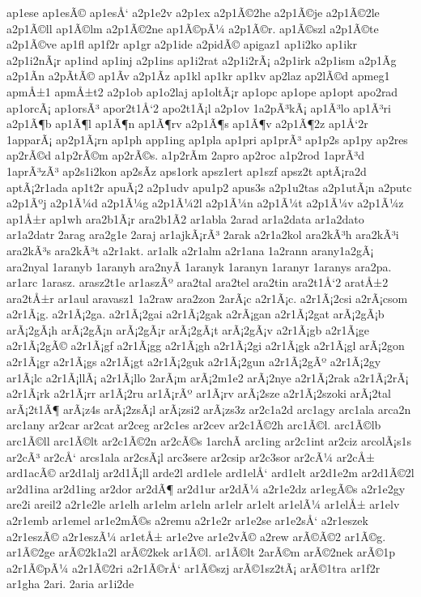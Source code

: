 {ap1ese
ap1esÃ©
ap1esÅ‘
a2p1e2v
a2p1ex
a2p1Ã©2he
a2p1Ã©je
a2p1Ã©2le
a2p1Ã©ll
ap1Ã©lm
a2p1Ã©2ne
ap1Ã©pÃ¼
a2p1Ã©r.
ap1Ã©szl
a2p1Ã©te
a2p1Ã©ve
ap1fl
ap1f2r
ap1gr
a2p1ide
a2pidÃ©
apigaz1
ap1i2ko
ap1ikr
a2p1i2nÃ¡r
ap1ind
ap1inj
a2p1ins
ap1i2rat
a2p1i2rÃ¡
a2p1irk
a2p1ism
a2p1Ã­g
a2p1Ã­n
a2pÃ­tÃ©
ap1Ã­v
a2p1Ã­z
ap1kl
ap1kr
ap1kv
ap2laz
ap2lÃ©d
apmeg1
apmÅ±1
apmÅ±t2
a2p1ob
ap1o2laj
ap1oltÃ¡r
ap1opc
ap1ope
ap1opt
apo2rad
ap1orcÃ¡
ap1orsÃ³
apor2t1Å‘2
apo2t1Ã¡l
a2p1ov
1a2pÃ³kÃ¡
ap1Ã³lo
ap1Ã³ri
a2p1Ã¶b
ap1Ã¶l
ap1Ã¶n
ap1Ã¶rv
a2p1Ã¶s
ap1Ã¶v
a2p1Ã¶2z
ap1Å‘2r
1apparÃ¡
ap2p1Ã¡rn
ap1ph
app1ing
ap1pla
ap1pri
ap1prÃ³
ap1p2s
ap1py
ap2res
ap2rÃ©d
a1p2rÃ©m
ap2rÃ©s.
a1p2rÃ­m
2apro
ap2roc
a1p2rod
1aprÃ³d
1aprÃ³zÃ³
ap2s1i2kon
ap2sÃ­z
aps1ork
apsz1ert
ap1szf
apsz2t
aptÃ¡ra2d
aptÃ¡2r1ada
ap1t2r
apuÃ¡2
a2p1udv
apu1p2
apus3s
a2p1u2tas
a2p1utÃ¡n
a2putc
a2p1Ãºj
a2p1Ã¼d
a2p1Ã¼g
a2p1Ã¼2l
a2p1Ã¼n
a2p1Ã¼t
a2p1Ã¼v
a2p1Ã¼z
ap1Å±r
ap1wh
ara2b1Ã¡r
ara2b1Ã­2
ar1abla
2arad
ar1a2data
ar1a2dato
ar1a2datr
2arag
ara2g1e
2araj
ar1ajkÃ¡rÃ³
2arak
a2r1a2kol
ara2kÃ³h
ara2kÃ³i
ara2kÃ³s
ara2kÃ³t
a2r1akt.
ar1alk
a2r1alm
a2r1ana
1a2rann
arany1a2gÃ¡
ara2nyal
1aranyb
1aranyh
ara2nyÃ­
1aranyk
1aranyn
1aranyr
1aranys
ara2pa.
ar1arc
1arasz.
arasz2t1e
ar1aszÃº
ara2tal
ara2tel
ara2tin
ara2t1Å‘2
aratÅ±2
ara2tÅ±r
ar1aul
aravasz1
1a2raw
ara2zon
2arÃ¡c
a2r1Ã¡c.
a2r1Ã¡2csi
a2rÃ¡csom
a2r1Ã¡g.
a2r1Ã¡2ga.
a2r1Ã¡2gai
a2r1Ã¡2gak
a2rÃ¡gan
a2r1Ã¡2gat
arÃ¡2gÃ¡b
arÃ¡2gÃ¡h
arÃ¡2gÃ¡n
arÃ¡2gÃ¡r
arÃ¡2gÃ¡t
arÃ¡2gÃ¡v
a2r1Ã¡gb
a2r1Ã¡ge
a2r1Ã¡2gÃ©
a2r1Ã¡gf
a2r1Ã¡gg
a2r1Ã¡gh
a2r1Ã¡2gi
a2r1Ã¡gk
a2r1Ã¡gl
arÃ¡2gon
a2r1Ã¡gr
a2r1Ã¡gs
a2r1Ã¡gt
a2r1Ã¡2guk
a2r1Ã¡2gun
a2r1Ã¡2gÃº
a2r1Ã¡2gy
ar1Ã¡lc
a2r1Ã¡llÃ¡
a2r1Ã¡llo
2arÃ¡m
arÃ¡2m1e2
arÃ¡2nye
a2r1Ã¡2rak
a2r1Ã¡2rÃ¡
a2r1Ã¡rk
a2r1Ã¡rr
ar1Ã¡2ru
ar1Ã¡rÃº
ar1Ã¡rv
arÃ¡2sze
a2r1Ã¡2szoki
arÃ¡2tal
arÃ¡2t1Ã¶
arÃ¡z4s
arÃ¡2zsÃ¡l
arÃ¡zsi2
arÃ¡zs3z
ar2c1a2d
arc1agy
arc1ala
arca2n
arc1any
ar2car
ar2cat
ar2ceg
ar2c1es
ar2cev
ar2c1Ã©2h
arc1Ã©l.
arc1Ã©lb
arc1Ã©ll
arc1Ã©lt
ar2c1Ã©2n
ar2cÃ©s
1archÃ­
arc1ing
ar2c1int
ar2ciz
arcolÃ¡s1s
ar2cÃ³
ar2cÅ‘
arcs1ala
ar2csÃ¡l
arc3sere
ar2csip
ar2c3sor
ar2cÃ¼
ar2cÅ±
ard1acÃ©
ar2d1alj
ar2d1Ã¡ll
arde2l
ard1ele
ard1elÅ‘
ard1elt
ar2d1e2m
ar2d1Ã©2l
ar2d1ina
ar2d1ing
ar2dor
ar2dÃ¶
ar2d1ur
ar2dÃ¼
a2r1e2dz
ar1egÃ©s
a2r1e2gy
are2i
areil2
a2r1e2le
ar1elh
ar1elm
ar1eln
ar1elr
ar1elt
ar1elÃ¼
ar1elÅ±
ar1elv
a2r1emb
ar1emel
ar1e2mÃ©s
a2remu
a2r1e2r
ar1e2se
ar1e2sÅ‘
a2r1eszek
a2r1eszÃ©
a2r1eszÃ¼
ar1etÅ±
ar1e2ve
ar1e2vÃ©
a2rew
arÃ©Ã©2
ar1Ã©g.
ar1Ã©2ge
arÃ©2k1a2l
arÃ©2kek
ar1Ã©l.
ar1Ã©lt
2arÃ©m
arÃ©2nek
arÃ©1p
a2r1Ã©pÃ¼
a2r1Ã©2ri
a2r1Ã©rÅ‘
ar1Ã©szj
arÃ©1sz2tÃ¡
arÃ©1tra
ar1f2r
ar1gha
2ari.
2aria
ar1i2de
}
